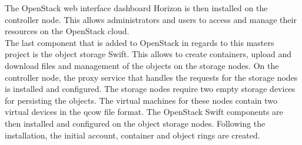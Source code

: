 The OpenStack web interface dashboard Horizon is then installed on the controller node. This allows administrators and users to access and manage their resources on the OpenStack cloud.\\

The last component that is added to OpenStack in regards to this masters project is the object storage Swift. This allows to create containers, upload and download files and management of the objects on the storage nodes. On the controller node, the proxy service that handles the requests for the storage nodes is installed and configured. The storage nodes require two empty storage devices for persisting the objects. The virtual machines for these nodes contain two virtual devices in the qcow file format. The OpenStack Swift components are then installed and configured on the object storage nodes. Following the installation, the initial account, container and object rings are created.







